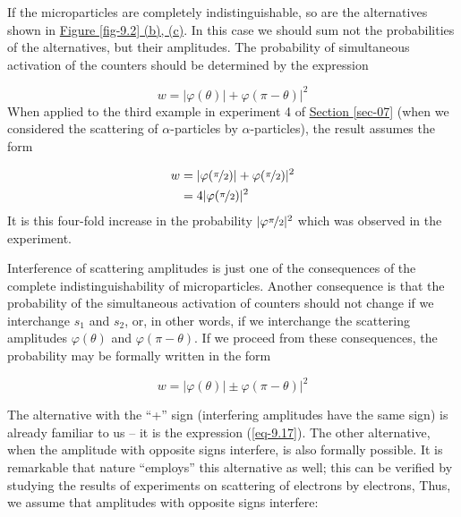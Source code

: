 \documentclass[a4paper,sfsidenotes,colorlinks=true]{tufte-book}
\numberwithin{equation}{section}
\numberwithin{figure}{section}
\begin{document}
If the microparticles are completely indistinguishable, so are the
alternatives shown in \hyperref[fig-9.2]{Figure \ref{fig-9.2} (b),
  (c)}. In  this case we should sum not the probabilities of the alternatives, but their amplitudes. The probability of simultaneous activation of the counters should be determined by the expression

\begin{equation}%
w = |\varphi (\theta)|+ \varphi (\pi - \theta)|^{2}
\label{eq-9.17}
\end{equation}
When applied to the third example in experiment 4 of  \hyperref[sec-07]{Section \ref{sec-07}} (when we considered the scattering of $\alpha$-particles by $\alpha$-particles), the result assumes the form

\begin{equation}%
\begin{split}
w &= |\varphi (\nicefrac{\pi}{2})|+ \varphi (\nicefrac{\pi}{2})|^{2}\\
& = 4 |\varphi(\nicefrac{\pi}{2})|^{2}
\end{split}
\label{eq-9.18}
\end{equation}
It is this four-fold increase in the probability $|\varphi
\nicefrac{\pi}{2}|^{2}$ which was observed in the experiment.

Interference of scattering amplitudes is just one of the consequences
of the complete indistinguishability of microparticles. Another
consequence is that the probability of the simultaneous activation of
counters should not change if we interchange $s_{1}$ and $s_{2}$, or,
in other words, if we interchange the scattering amplitudes
$\varphi(\theta)$ and $\varphi(\pi - \theta)$. If we proceed from these consequences, the probability may be formally written in the form

\begin{equation}%
w = |\varphi (\theta)| \pm \varphi (\pi - \theta)|^{2}
\label{eq-9.19}
\end{equation}

The alternative with the ``+'' sign (interfering amplitudes have the
same sign) is already familiar to us -- it is the expression (\ref{eq-9.17}). The other alternative, when the amplitude with opposite signs interfere, is also formally possible. It is remarkable that nature ``employs'' this alternative as well; this can be verified by studying the results of experiments on scattering of electrons by electrons, Thus, we assume that amplitudes with opposite signs interfere:
\end{document}
